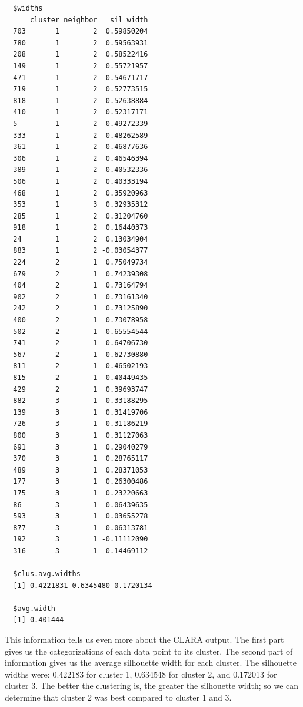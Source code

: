 \documentclass[12pt,twoside]{amherstthesis}
\begin{document}
  \begin{Shaded}
  \begin{Highlighting}[]
  \OperatorTok{$}
  \end{Highlighting}
  \end{Shaded}
  
  \begin{verbatim}
  $widths
      cluster neighbor   sil_width
  703       1        2  0.59850204
  780       1        2  0.59563931
  208       1        2  0.58522416
  149       1        2  0.55721957
  471       1        2  0.54671717
  719       1        2  0.52773515
  818       1        2  0.52638884
  410       1        2  0.52317171
  5         1        2  0.49272339
  333       1        2  0.48262589
  361       1        2  0.46877636
  306       1        2  0.46546394
  389       1        2  0.40532336
  506       1        2  0.40333194
  468       1        2  0.35920963
  353       1        3  0.32935312
  285       1        2  0.31204760
  918       1        2  0.16440373
  24        1        2  0.13034904
  883       1        2 -0.03054377
  224       2        1  0.75049734
  679       2        1  0.74239308
  404       2        1  0.73164794
  902       2        1  0.73161340
  242       2        1  0.73125890
  400       2        1  0.73078958
  502       2        1  0.65554544
  741       2        1  0.64706730
  567       2        1  0.62730880
  811       2        1  0.46502193
  815       2        1  0.40449435
  429       2        1  0.39693747
  882       3        1  0.33188295
  139       3        1  0.31419706
  726       3        1  0.31186219
  800       3        1  0.31127063
  691       3        1  0.29040279
  370       3        1  0.28765117
  489       3        1  0.28371053
  177       3        1  0.26300486
  175       3        1  0.23220663
  86        3        1  0.06439635
  593       3        1  0.03655278
  877       3        1 -0.06313781
  192       3        1 -0.11112090
  316       3        1 -0.14469112
  
  $clus.avg.widths
  [1] 0.4221831 0.6345480 0.1720134
  
  $avg.width
  [1] 0.401444
  \end{verbatim}
  
  This information tells us even more about the CLARA output. The first
  part gives us the categorizations of each data point to its cluster. The
  second part of information gives us the average silhouette width for
  each cluster. The silhouette widths were: 0.422183 for cluster 1,
  0.634548 for cluster 2, and 0.172013 for cluster 3. The better the
  clustering is, the greater the silhouette width; so we can determine
  that cluster 2 was best compared to cluster 1 and 3.
  
\end{document}
